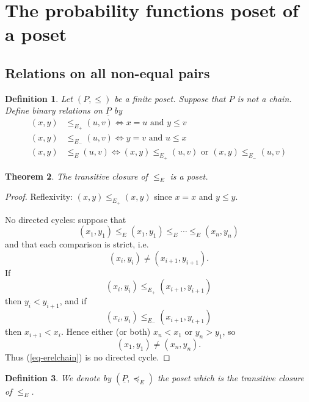\documentclass[11pt,a4paper,abstract=yes]{scrartcl}
\theoremstyle{plain}
\newtheorem{theorem}{Theorem}[section]
\newtheorem{definition}[theorem]{Definition}
\newcommand{\arel}{\le_{E_+}}
\newcommand{\brel}{\le_{E_-}}
\newcommand{\erel}{\le_{E}}
\newcommand{\transerel}{\preceq_{E}}
\newcommand{\Pairs}[1]{\underline{#1}}
\newcommand{\Ppairs}{\Pairs{P}}
\begin{document}
\section{The probability functions poset of a poset}
\label{sec:org4b3e4ab}
\subsection{Relations on all non-equal pairs}
\label{sec:orgad4a4f5}
\begin{definition}
Let \((P,\le)\) be a finite poset. Suppose that \(P\) is not a chain.
Define  binary relations on \(\Ppairs\) by
\begin{equation}
\label{eq-erel}
  \begin{split}
    (x,y) & \arel (u,v) \iff x = u \text{ and } y \le v \\
    (x,y) & \brel (u,v) \iff y = v \text{ and } u \le x \\
    (x,y) & \erel (u,v) \iff (x,y) \arel (u,v) \text{ or } (x,y) \brel (u,v)
  \end{split}
\end{equation}
\end{definition}


\begin{theorem}
The transitive closure of \(\erel\) is a poset.
\label{punc-poset}
\end{theorem}
\begin{proof}


Reflexivity: \((x,y) \arel (x,y)\) since \(x=x\) and \(y \le y\).

No directed cycles: suppose that
\begin{equation}
\label{eq-erelchain}
(x_{1},y_{1}) \erel (x_{1},y_{1}) \erel \cdots \erel (x_{n},y_{n})
\end{equation}
and that each comparison is strict, i.e.
\[(x_{i},y_{i}) \neq (x_{i+1},y_{i+1}).\]
If
\[(x_{i},y_{i}) \arel (x_{i+1},y_{i+1})\] then \(y_{i} < y_{i+1}\), and if
\[(x_{i},y_{i}) \brel (x_{i+1},y_{i+1})\] then \(x_{i+1} < x_{i}\). Hence either (or both) \(x_{n} < x_{1}\) or \(y_{n} > y_{1}\), so
\[(x_{1},y_{1}) \neq (x_{n},y_{n}).\] Thus (\ref{eq-erelchain}) is no directed cycle.
\end{proof}

\begin{definition}
We denote by \((\Ppairs, \transerel)\) the poset which is the transitive closure of \(\erel\).
\end{definition}
\end{document}

